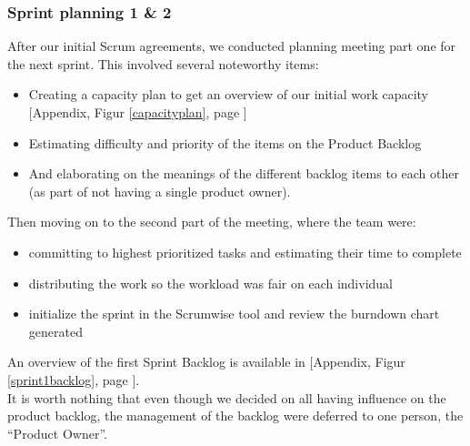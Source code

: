 \subsubsection{Sprint planning 1 \& 2}
After our initial Scrum agreements, we conducted planning meeting part one for the next sprint. This involved several noteworthy items:
\begin{itemize}
\item Creating a capacity plan to get an overview of our initial work capacity [Appendix, Figur \ref{capacityplan}, page \pageref{capacityplan}]
\item Estimating difficulty and priority of the items on the Product Backlog
\item And elaborating on the meanings of the different backlog items to each other (as part of not having a single product owner).
\end{itemize}
Then moving on to the second part of the meeting, where the team were:
\begin{itemize}
\item committing to highest prioritized tasks and estimating their time to complete
\item distributing the work so the workload was fair on each individual
\item initialize the sprint in the Scrumwise tool and review the burndown chart generated
\end{itemize}
An overview of the first Sprint Backlog is available in [Appendix, Figur \ref{sprint1backlog}, page \pageref{sprint1backlog}].\\
It is worth nothing that even though we decided on all having influence on the product backlog, the management of the backlog were deferred to one person, the “Product Owner”.\\



\newpage